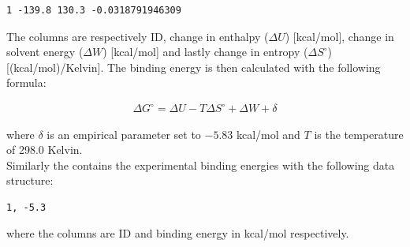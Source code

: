 \documentclass{article}
\begin{document}
\begin{lstlisting}
1 -139.8 130.3 -0.0318791946309
\end{lstlisting}

The columns are respectively ID, change in enthalpy ($\Delta U$) [kcal/mol], change in solvent energy ($\Delta W$) [kcal/mol] and lastly change in entropy ($\Delta S^\circ$) [(kcal/mol)/Kelvin].
The binding energy is then calculated with the following formula:

\begin{align}
    \Delta G^\circ = \Delta U - T \Delta S^\circ + \Delta W + \delta
\end{align}

where $\delta$ is an empirical parameter set to $-5.83$ kcal/mol and $T$ is the temperature of 298.0 Kelvin.\\

Similarly the  contains the experimental binding energies with the following data structure:

\begin{lstlisting}
1, -5.3
\end{lstlisting}

where the columns are ID and binding energy in kcal/mol respectively.
\end{document}
